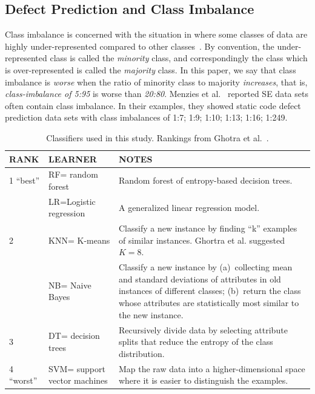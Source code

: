\documentclass[sigconf]{acmart}
\theoremstyle{break}
\begin{document}


\subsection{Defect Prediction and Class Imbalance}
\label{sect:imbalance}
  Class imbalance  is concerned with the situation in where some classes of data are
highly under-represented compared to other classes~\cite{he2009learning}.
By convention,
the under-represented class is called the {\em minority} class,
and correspondingly the class which is over-represented is called the
{\em majority} class. In this paper, we say that class imbalance is {\em worse}
when the ratio of minority class to majority {\em increases}, that is,
{\em class-imbalance of 5:95} is worse than {\em 20:80}. Menzies et al.~\cite{menzies2007problems} reported SE data sets often contain class imbalance. In their examples, they showed static code defect prediction data sets with
class imbalances of 1:7; 1:9; 1:10; 1:13; 1:16; 1:249. 


 \begin{table}[!t]
 \caption{Classifiers used in this study.
 Rankings
 from Ghotra et al.~\cite{ghotra2015revisiting}.}
 \vspace{-0.2cm}
 \label{tbl:learners}
 \footnotesize
 \begin{tabular}{l|l|p{4.5in}}
{\bf RANK} & {\bf LEARNER} & {\bf NOTES}\\\hline
 1 ``best'' & RF= random forest & 
 Random forest of entropy-based decision trees.\\\cline{2-3}
 &  LR=Logistic regression &
 A generalized linear regression
model.\\\hline
 2 & KNN= K-means &  Classify a new instance by finding ``k'' examples of similar instances.
 Ghortra et al. suggested
 $K=8$.\\\cline{2-3}
 & NB= Naive Bayes &  Classify a new instance by (a)~collecting mean and standard deviations of attributes in old instances of  different classes; (b)~return the class whose attributes are statistically most similar to the new instance.\\\hline
 3 & DT= decision trees & Recursively
 divide data by selecting attribute splits
 that reduce the entropy of the class distribution.\\\hline

 4 ``worst'' & SVM= support vector machines &
 Map the raw data into a higher-dimensional space where it is easier to distinguish the examples.
 \\\hline
 \end{tabular}
 \vspace{-0.2cm}
 \end{table}
 
\end{document}
